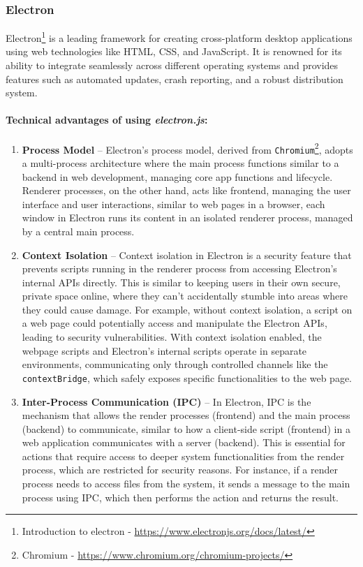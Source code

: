 \subsubsection{Electron}
\label{theory:electron}
Electron\footnote{Introduction to electron - \url{https://www.electronjs.org/docs/latest/}} is a leading framework for creating cross-platform desktop applications using web technologies like HTML, CSS, and JavaScript. It is renowned for its ability to integrate seamlessly across different operating systems and provides features such as automated updates, crash reporting, and a robust distribution system.

\paragraph{Technical advantages of using \textit{electron.js}:}
\begin{enumerate}
    \item \textbf{Process Model} --
    Electron's process model, derived from \texttt{Chromium}\footnote{Chromium - \url{https://www.chromium.org/chromium-projects/}}, adopts a multi-process architecture where the main process functions similar to a backend in web development, managing core app functions and lifecycle. Renderer processes, on the other hand, acts like frontend, managing the user interface and user interactions, similar to web pages in a browser, each window in Electron runs its content in an isolated renderer process, managed by a central main process.
    \item \textbf{Context Isolation} --
    Context isolation in Electron is a security feature that prevents scripts running in the renderer process from accessing Electron's internal APIs directly. This is similar to keeping users in their own secure, private space online, where they can't accidentally stumble into areas where they could cause damage. For example, without context isolation, a script on a web page could potentially access and manipulate the Electron APIs, leading to security vulnerabilities. With context isolation enabled, the webpage scripts and Electron's internal scripts operate in separate environments, communicating only through controlled channels like the \texttt{contextBridge}, which safely exposes specific functionalities to the web page.
    \item \textbf{Inter-Process Communication (IPC)} --
    In Electron, IPC is the mechanism that allows the render processes (frontend) and the main process (backend) to communicate, similar to how a client-side script (frontend) in a web application communicates with a server (backend). This is essential for actions that require access to deeper system functionalities from the render process, which are restricted for security reasons. For instance, if a render process needs to access files from the system, it sends a message to the main process using IPC, which then performs the action and returns the result. \label{theory:electron:ipc}
\end{enumerate}


